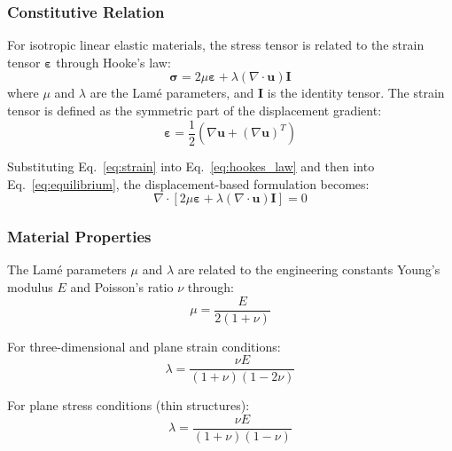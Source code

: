 \documentclass[12pt]{extarticle}
\newcommand{\<}{\langle}
\renewcommand{\>}{\rangle}
\theoremstyle{definition}
\begin{document}
\subsubsection{Constitutive Relation}

For isotropic linear elastic materials, the stress tensor is related to the strain tensor $\boldsymbol{\varepsilon}$ through Hooke's law:
\begin{equation}
    \boldsymbol{\sigma} = 2\mu \boldsymbol{\varepsilon} + \lambda (\nabla \cdot \textbf{u}) \textbf{I} \label{eq:hookes_law}
\end{equation}
where $\mu$ and $\lambda$ are the Lam\'e parameters, and $\textbf{I}$ is the identity tensor. The strain tensor is defined as the symmetric part of the displacement gradient:
\begin{equation}
    \boldsymbol{\varepsilon} = \frac{1}{2}\left(\nabla \textbf{u} + (\nabla \textbf{u})^T\right) \label{eq:strain}
\end{equation}

Substituting Eq.~\ref{eq:strain} into Eq.~\ref{eq:hookes_law} and then into Eq.~\ref{eq:equilibrium}, the displacement-based formulation becomes:
\begin{equation}
    \nabla \cdot \left[2\mu \boldsymbol{\varepsilon} + \lambda (\nabla \cdot \textbf{u}) \textbf{I}\right] = 0 \label{eq:solid_disp_full}
\end{equation}

\subsubsection{Material Properties}

The Lam\'e parameters $\mu$ and $\lambda$ are related to the engineering constants Young's modulus $E$ and Poisson's ratio $\nu$ through:
\begin{equation}
    \mu = \frac{E}{2(1+\nu)} \label{eq:lame_mu}
\end{equation}

For three-dimensional and plane strain conditions:
\begin{equation}
    \lambda = \frac{\nu E}{(1+\nu)(1-2\nu)} \label{eq:lame_lambda_3d}
\end{equation}

For plane stress conditions (thin structures):
\begin{equation}
    \lambda = \frac{\nu E}{(1+\nu)(1-\nu)} \label{eq:lame_lambda_ps}
\end{equation}
\end{document}
